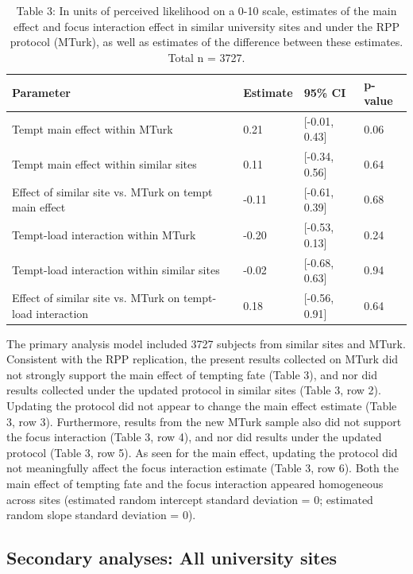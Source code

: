 \documentclass[english,floatsintext,man]{apa6}
\theoremstyle{definition}
\theoremstyle{definition}
\theoremstyle{definition}
\theoremstyle{remark}
\begin{document}
\begin{table}[tbp]
\begin{center}
\begin{threeparttable}
\caption{\label{tab:unnamed-chunk-2}Table 3: In units of perceived likelihood on a 0-10 scale, estimates of the main effect and focus interaction effect in similar university sites and under the RPP protocol (MTurk), as well as estimates of the difference between these estimates. Total n = 3727.}
\begin{tabular}{llll}
\toprule
Parameter & Estimate & 95\% CI & p-value\\
\midrule
Tempt main effect within MTurk & 0.21 & [-0.01, 0.43] & 0.06\\
Tempt main effect within similar sites & 0.11 & [-0.34, 0.56] & 0.64\\
Effect of similar site vs. MTurk on tempt main effect & -0.11 & [-0.61, 0.39] & 0.68\\
Tempt-load interaction within MTurk & -0.20 & [-0.53, 0.13] & 0.24\\
Tempt-load interaction within similar sites & -0.02 & [-0.68, 0.63] & 0.94\\
Effect of similar site vs. MTurk on tempt-load interaction & 0.18 & [-0.56, 0.91] & 0.64\\
\bottomrule
\end{tabular}
\end{threeparttable}
\end{center}
\end{table}

The primary analysis model included 3727 subjects from similar sites and
MTurk. Consistent with the RPP replication, the present results
collected on MTurk did not strongly support the main effect of tempting
fate (Table 3), and nor did results collected under the updated protocol
in similar sites (Table 3, row 2). Updating the protocol did not appear
to change the main effect estimate (Table 3, row 3). Furthermore,
results from the new MTurk sample also did not support the focus
interaction (Table 3, row 4), and nor did results under the updated
protocol (Table 3, row 5). As seen for the main effect, updating the
protocol did not meaningfully affect the focus interaction estimate
(Table 3, row 6). Both the main effect of tempting fate and the focus
interaction appeared homogeneous across sites (estimated random
intercept standard deviation = 0; estimated random slope standard
deviation = 0).

\subsection{Secondary analyses: All university
sites}\label{secondary-analyses-all-university-sites}
\end{document}
